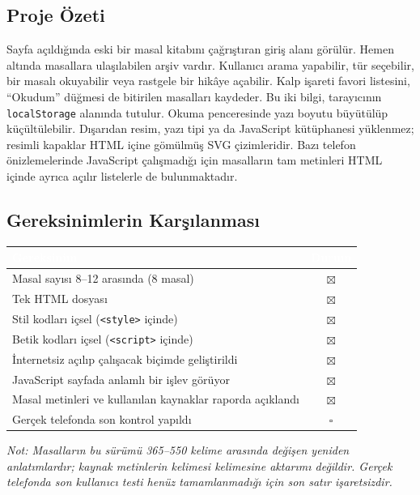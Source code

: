 \documentclass[12pt,a4paper]{article}
\begin{document}
\subsection{Proje Özeti}
Sayfa açıldığında eski bir masal kitabını çağrıştıran giriş alanı görülür. Hemen altında masallara ulaşılabilen arşiv vardır. Kullanıcı arama yapabilir, tür seçebilir, bir masalı okuyabilir veya rastgele bir hikâye açabilir. Kalp işareti favori listesini, ``Okudum'' düğmesi de bitirilen masalları kaydeder. Bu iki bilgi, tarayıcının \texttt{localStorage} alanında tutulur. Okuma penceresinde yazı boyutu büyütülüp küçültülebilir. Dışarıdan resim, yazı tipi ya da JavaScript kütüphanesi yüklenmez; resimli kapaklar HTML içine gömülmüş SVG çizimleridir. Bazı telefon önizlemelerinde JavaScript çalışmadığı için masalların tam metinleri HTML içinde ayrıca açılır listelerle de bulunmaktadır.

\subsection{Gereksinimlerin Karşılanması}
\begin{center}
\begin{tabular}{@{}p{8.2cm}c@{}}
\toprule
\rowcolor{ana}\textcolor{white}{\textbf{Gereksinim}} & \textcolor{white}{\textbf{Durum}} \\
\midrule
Masal sayısı 8--12 arasında (8 masal) & $\boxtimes$ \\
Tek HTML dosyası & $\boxtimes$ \\
Stil kodları içsel (\texttt{<style>} içinde) & $\boxtimes$ \\
Betik kodları içsel (\texttt{<script>} içinde) & $\boxtimes$ \\
İnternetsiz açılıp çalışacak biçimde geliştirildi & $\boxtimes$ \\
JavaScript sayfada anlamlı bir işlev görüyor & $\boxtimes$ \\
Masal metinleri ve kullanılan kaynaklar raporda açıklandı & $\boxtimes$ \\
Gerçek telefonda son kontrol yapıldı & $\square$ \\
\bottomrule
\end{tabular}
\end{center}
\textit{Not: Masalların bu sürümü 365--550 kelime arasında değişen yeniden anlatımlardır; kaynak metinlerin kelimesi kelimesine aktarımı değildir. Gerçek telefonda son kullanıcı testi henüz tamamlanmadığı için son satır işaretsizdir.}
\end{document}
